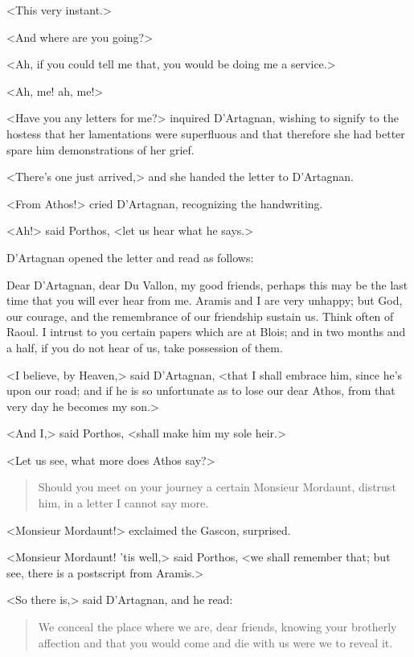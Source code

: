 <This very instant.>

<And where are you going?>

<Ah, if you could tell me that, you would be doing me a service.>

<Ah, me! ah, me!>

<Have you any letters for me?> inquired D'Artagnan, wishing to signify to the hostess that her lamentations were superfluous and that therefore she had better spare him demonstrations of her grief.

<There's one just arrived,> and she handed the letter to D'Artagnan.

<From Athos!> cried D'Artagnan, recognizing the handwriting.

<Ah!> said Porthos, <let us hear what he says.>

D'Artagnan opened the letter and read as follows: 

\begin{mail}{}{}Dear D'Artagnan, dear Du Vallon, my good friends, perhaps this may be the last time that you will ever hear from me. Aramis and I are very unhappy; but God, our courage, and the remembrance of our friendship sustain us. Think often of Raoul. I intrust to you certain papers which are at Blois; and in two months and a half, if you do not hear of us, take possession of them.
\end{mail}

<I believe, by Heaven,> said D'Artagnan, <that I shall embrace him, since he's upon our road; and if he is so unfortunate as to lose our dear Athos, from that very day he becomes my son.>

<And I,> said Porthos, <shall make him my sole heir.>

<Let us see, what more does Athos say?>

\begin{quote}
Should you meet on your journey a certain Monsieur Mordaunt, distrust him, in a letter I cannot say more.
\end{quote}

<Monsieur Mordaunt!> exclaimed the Gascon, surprised.

<Monsieur Mordaunt! 'tis well,> said Porthos, <we shall remember that; but see, there is a postscript from Aramis.>

<So there is,> said D'Artagnan, and he read:

\begin{quote}
We conceal the place where we are, dear friends, knowing your brotherly affection and that you would come and die with us were we to reveal it.
\end{quote}

